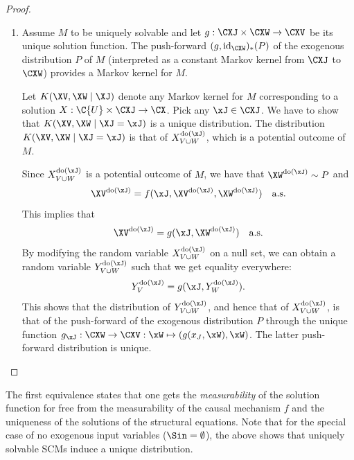 \begin{proof}
\begin{enumerate}
\item
  Assume $M$ to be uniquely solvable and let $g : \CXJ \times \CXW \to \CXV$ be its unique solution function.
  The push-forward $(g,\id_{\CXW})_*(P)$ of the exogenous distribution $P$ of $M$ (interpreted as a constant 
  Markov kernel from $\CXJ$ to $\CXW$) provides a Markov kernel for $M$.
  
  Let $K(\XV,\XW \mid \XJ)$ denote any Markov kernel for $M$ corresponding to a solution $X : \C{U} \times \CXJ \to \CX$.
  Pick any $\xJ\in\CXJ$. 
  We have to show that $K(\XV,\XW \mid \XJ=\xJ)$ is a unique distribution.
  The distribution $K(\XV,\XW \mid \XJ=\xJ)$ is that of $X_{V\cup W}^{\doit(\xJ)}$, which is a potential outcome of $M$.

  Since $X_{V\cup W}^{\doit(\xJ)}$ is a potential outcome of $M$, we have that $\XW^{\doit(\xJ)} \sim P$ and
    $$\XV^{\doit(\xJ)} = f(\xJ,\XV^{\doit(\xJ)},\XW^{\doit(\xJ)}) \quad\text{a.s.}$$
  This implies that
    $$\XV^{\doit(\xJ)} = g(\xJ,\XW^{\doit(\xJ)}) \quad\text{a.s.}$$
   By modifying the random variable $X_{V\cup W}^{\doit(\xJ)}$ on a null set, we can obtain a random variable $Y_{V\cup W}^{\doit(\xJ)}$ such that we get equality everywhere:
  $$Y_V^{\doit(\xJ)} = g(\xJ,Y_W^{\doit(\xJ)}).$$
  This shows that the distribution of $Y_{V\cup W}^{\doit(\xJ)}$, and hence that of $X_{V\cup W}^{\doit(\xJ)}$, 
  is that of the push-forward of the exogenous distribution $P$ through the unique function
  $g_{\xJ} : \CXW \to \CXV : \xW \mapsto (g(x_J,\xW),\xW)$.
  The latter push-forward distribution is unique.
  \end{enumerate}
\end{proof}
The first equivalence states that one gets the \emph{measurability}
of the solution function for free from the measurability of the causal mechanism $f$ and 
the uniqueness of the solutions of the structural equations.
Note that for the special case of no exogenous input variables ($\Sin = \emptyset$), 
the above shows that uniquely solvable SCMs induce a unique distribution.

